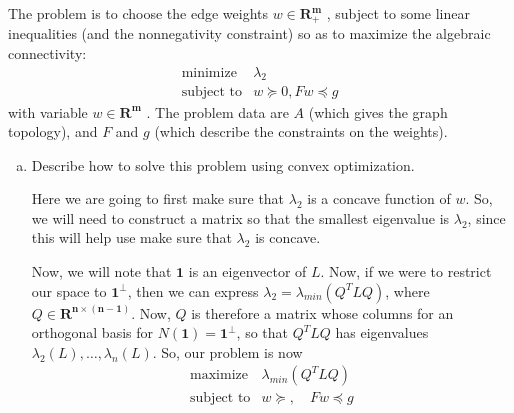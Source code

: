 The problem is to choose the edge weights $w \in \mathbf{R^{m}_{+}}$ , subject to some linear inequalities (and the
nonnegativity constraint) so as to maximize the algebraic connectivity:
\begin{eqnarray*}
\mbox{minimize} & \lambda_{2}\\
\mbox{subject to} & w \succeq 0, Fw \preceq g
\end{eqnarray*}
with variable $w \in \mathbf{R^{m}}$ . The problem data are $A$ (which gives the graph topology), and $F$ and $g$
(which describe the constraints on the weights).
\begin{enumerate}[(a)]
\item{Describe how to solve this problem using convex optimization.

Here we are going to first make sure that $\lambda_{2}$ is a concave function of $w$. So, we will need to construct a matrix so that the smallest eigenvalue is $\lambda_{2}$, since this will help use make sure that $\lambda_{2}$ is concave.

Now, we will note that $\mathbf{1}$ is an eigenvector of $L$. Now, if we were to restrict our space to $\mathbf{1}^{\perp}$, then we can express $\lambda_{2} = \lambda_{min}(Q^{T}LQ)$, where $Q \in \mathbf{R^{n \times (n-1)}}$.  Now, $Q$ is therefore a matrix whose columns for an orthogonal basis for $N(\mathbf{1}) = \mathbf{1^{\perp}}$, so that $Q^{T}LQ$ has eigenvalues $\lambda_{2}(L),\ldots,\lambda_{n}(L)$.  So, our problem is now
\begin{eqnarray*}
\mbox{maximize} & \lambda_{min}(Q^{T}LQ)\\
\mbox{subject to} & w \succeq, \quad Fw \preceq g
\end{eqnarray*}}


\end{enumerate}
